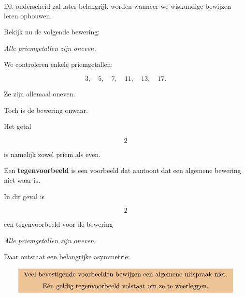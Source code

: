 \documentclass{ximera}
\begin{document}
Dit onderscheid zal later belangrijk worden wanneer we wiskundige
bewijzen leren opbouwen.



Bekijk nu de volgende bewering:

\begin{center}
\textit{Alle priemgetallen zijn oneven.}
\end{center}

We controleren enkele priemgetallen:

\[
3,\quad5,\quad7,\quad11,\quad13,\quad17.
\]

Ze zijn allemaal oneven.

Toch is de bewering onwaar.

Het getal

\[
2
\]

is namelijk zowel priem als even.


\begin{definitie}
Een \textbf{tegenvoorbeeld} is een voorbeeld dat aantoont dat een
algemene bewering niet waar is.
\end{definitie}


In dit geval is

\[
2
\]

een tegenvoorbeeld voor de bewering

\begin{center}
\textit{Alle priemgetallen zijn oneven.}
\end{center}


Daar ontstaat een belangrijke asymmetrie:

\[
\important{
\begin{array}{c}
\text{Veel bevestigende voorbeelden bewijzen een algemene uitspraak niet.}\\[2mm]
\text{Eén geldig tegenvoorbeeld volstaat om ze te weerleggen.}
\end{array}
}
\]
\end{document}
